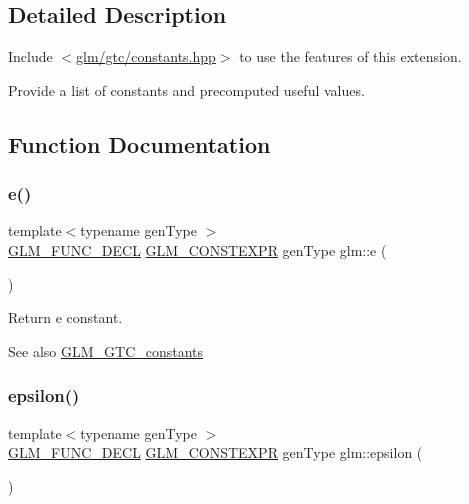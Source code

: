 \subsection{Detailed Description}
Include $<$\hyperlink{constants_8hpp}{glm/gtc/constants.\+hpp}$>$ to use the features of this extension.

Provide a list of constants and precomputed useful values. 

\subsection{Function Documentation}
\mbox{\label{group__gtc__constants_ga4b7956eb6e2fbedfc7cf2e46e85c5139}} 
\subsubsection{\texorpdfstring{e()}{e()}}
{\footnotesize\ttfamily template$<$typename gen\+Type $>$ \\
\hyperlink{setup_8hpp_ab2d052de21a70539923e9bcbf6e83a51}{G\+L\+M\+\_\+\+F\+U\+N\+C\+\_\+\+D\+E\+CL} \hyperlink{setup_8hpp_a08b807947b47031d3a511f03f89645ad}{G\+L\+M\+\_\+\+C\+O\+N\+S\+T\+E\+X\+PR} gen\+Type glm\+::e (\begin{DoxyParamCaption}{ }\end{DoxyParamCaption})}

Return e constant. \begin{DoxySeeAlso}{See also}
\hyperlink{group__gtc__constants}{G\+L\+M\+\_\+\+G\+T\+C\+\_\+constants} 
\end{DoxySeeAlso}
\mbox{\label{group__gtc__constants_ga2a1e57fc5592b69cfae84174cbfc9429}} 
\subsubsection{\texorpdfstring{epsilon()}{epsilon()}}
{\footnotesize\ttfamily template$<$typename gen\+Type $>$ \\
\hyperlink{setup_8hpp_ab2d052de21a70539923e9bcbf6e83a51}{G\+L\+M\+\_\+\+F\+U\+N\+C\+\_\+\+D\+E\+CL} \hyperlink{setup_8hpp_a08b807947b47031d3a511f03f89645ad}{G\+L\+M\+\_\+\+C\+O\+N\+S\+T\+E\+X\+PR} gen\+Type glm\+::epsilon (\begin{DoxyParamCaption}{ }\end{DoxyParamCaption})}

